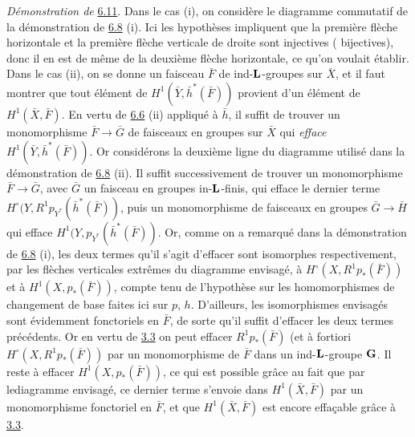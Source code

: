 \documentclass[10pt]{../fichiers-configuration-latex/smfart}
\begin{document}
\noindent
\emph{Démonstration de} \hyperref[XII.prop6.11]{6.11}. Dans le cas (i), on considère le
diagramme commutatif de la démonstration de \hyperref[XII.prop6.8]{6.8} (i). Ici les
hypothèses impliquent que la première flèche horizontale et la
première flèche verticale de droite sont injectives (\resp
bijectives), donc il en est de même de la deuxième flèche horizontale,
ce qu'on voulait établir. Dans le cas (ii), on se donne un faisceau
$\bar{F}$ de ind-$\mathbf{L}$-groupes sur $\bar{X}$, et il faut
montrer que tout élément de $H^1(\bar{Y},\bar{h}^{\ast}(\bar{F}))$
provient d'un élément de $H^1(\bar{X},\bar{F})$. En vertu de \hyperref[XII.cor6.6]{6.6} (ii)
appliqué à $\bar{h}$, il suffit de trouver un monomorphisme
$\bar{F}\rightarrow \bar{G}$ de faisceaux en groupes sur $\bar{X}$ qui
\emph{efface} $H^1(\bar{Y},\bar{h}^{\ast}(\bar{F}))$. Or considérons
la deuxième ligne du diagramme utilisé dans la démonstration de \hyperref[XII.prop6.8]{6.8}
(ii). Il suffit successivement de trouver un monomorphisme
$\bar{F}\rightarrow \bar{G}$, avec $\bar{G}$ un faisceau en groupes
in-$\mathbf{L}$-finis, qui efface le dernier terme $H^{\circ}(Y,R^1
p_{Y^{\ast}}(\bar{h}^{\ast}(\bar{F}))$, puis un monomorphisme de
faisceaux en groupes $\bar{G}\rightarrow \bar{H}$ qui efface
$H^1(Y,p_{Y^{\ast}}(\bar{h}^{\ast}(\bar{F}))$. Or, comme on a remarqué
dans la démonstration de \hyperref[XII.prop6.8]{6.8} (i), les deux termes qu'il s'agit
d'effacer sont isomorphes respectivement, par les flèches verticales
extrêmes du diagramme envisagé, à $H^{\circ}(X,R^1p_{\ast}(\bar{F}))$
et à $H^1(X,p_{\ast}(\bar{F}))$, compte tenu de l'hypothèse sur les
homomorphismes de changement de base faites ici sur $p$,
$h$. D'ailleurs, les isomorphismes envisagés sont évidemment
fonctoriels en $\bar{F}$, de sorte qu'il suffit d'effacer les deux
termes précédents. Or en vertu de \hyperref[XII.prop3.3]{3.3} on peut effacer
$R^1p_{\ast}(\bar{F})$ (et à fortiori
$H^{\circ}(X,R^1p_{\ast}(\bar{F}))$ par un monomorphisme de $\bar{F}$
dans un ind-$\mathbf{L}$-groupe $\mathbf{G}$. Il reste à effacer
$H^1(X,p_{\ast}(\bar{F}))$, ce qui est possible grâce au fait que par
le\pageoriginale diagramme envisagé, ce dernier terme s'envoie dans
$H^1(\bar{X},\bar{F})$ par un monomorphisme fonctoriel en $\bar{F}$,
et que $H^1(\bar{X},\bar{F})$ est encore effaçable grâce à \hyperref[XII.prop3.3]{3.3}.
\end{document}
